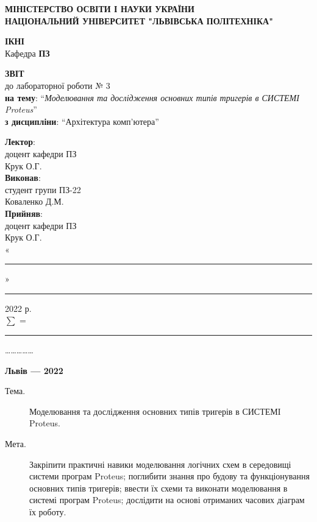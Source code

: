 \documentclass{article}
\newcommand\subject{Архітектура комп'ютера}
\newcommand\lecturer{доцент кафедри ПЗ\\Крук О.Г.}
\newcommand\teacher{доцент кафедри ПЗ\\Крук О.Г.}
\newcommand\mygroup{ПЗ-22}
\newcommand\lab{3}
\newcommand\theme{Моделювання та дослідження основних типів тригерів в СИСТЕМІ Proteus}
\newcommand\purpose{Закріпити практичні навики моделювання логічних схем в середовищі системи програм Proteus; поглибити знання про будову та функціонування основних типів тригерів; ввести їх схеми та виконати моделювання в системі програм Proteus; дослідити на основі отриманих часових діаграм їх роботу}
\begin{document}
\begin{normalsize}
	\begin{titlepage}
		\thispagestyle{empty}
		\begin{center}
			\textbf{МІНІСТЕРСТВО ОСВІТИ І НАУКИ УКРАЇНИ\\
				НАЦІОНАЛЬНИЙ УНІВЕРСИТЕТ "ЛЬВІВСЬКА ПОЛІТЕХНІКА"}
		\end{center}
		\begin{flushright}
			\textbf{ІКНІ}\\
			Кафедра \textbf{ПЗ}
		\end{flushright}
		\vspace{200pt}
		\begin{center}
			\textbf{ЗВІТ}\\
			\vspace{10pt}
			до лабораторної роботи № \lab\\
			\textbf{на тему}: “\textit{\theme}”\\
			\textbf{з дисципліни}: “\subject”
		\end{center}
		\vspace{112pt}
		\begin{flushright}
			
			\textbf{Лектор}:\\
			\lecturer\\
			\vspace{28pt}
			\textbf{Виконав}:\\
			
			студент групи \mygroup\\
			Коваленко Д.М.\\
			\vspace{28pt}
			\textbf{Прийняв}:\\
			
			\teacher\\
			
			\vspace{28pt}
			«\rule{1cm}{0.15mm}» \rule{1.5cm}{0.15mm} 2022 р.\\
			$\sum$ = \rule{1cm}{0.15mm}……………\\
			
		\end{flushright}
		\vspace{\fill}
		\begin{center}
			\textbf{Львів — 2022}
		\end{center}
	\end{titlepage}
		
	\begin{description}
		\item[Тема.] \theme.
		\item[Мета.] \purpose.
	\end{description}


\end{normalsize}
\end{document}
